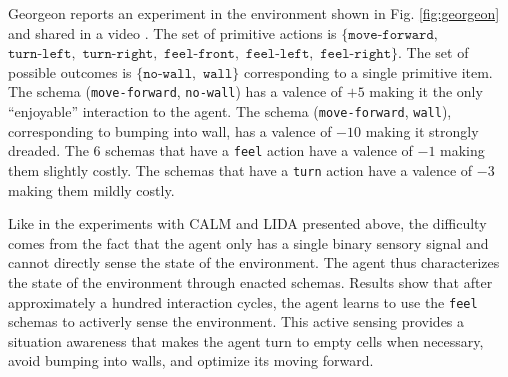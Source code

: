 \documentclass[runningheads]{llncs}
\begin{document}


Georgeon \cite{georgeon_intrinsically-motivated_2012} reports an experiment in the environment shown in Fig. \ref{fig:georgeon} and shared in a video \cite{georgeon_video_2012}.
The set of primitive actions is $\{ \texttt{move-forward},$ $\texttt{turn-left},$ $\texttt{turn-right},$ $\texttt{feel-front},$ $\texttt{feel-left},$ $\texttt{feel-right}\}$.
The set of possible outcomes is $\{ \texttt{no-wall},$ $ \texttt{wall} \}$ corresponding to a single primitive item. 
The schema (\texttt{move-forward}, \texttt{no-wall}) has a valence of $+5$ making it the only ``enjoyable'' interaction to the agent. 
The schema (\texttt{move-forward}, \texttt{wall}), corresponding to bumping into wall, has a valence of $-10$ making it strongly dreaded. 
The 6 schemas that have a \texttt{feel} action have a valence of $-1$ making them slightly costly. 
The schemas that have a \texttt{turn} action  have a valence of $-3$ making them mildly costly. 

Like in the experiments with CALM and LIDA presented above, the difficulty comes from the fact that the agent only has a single binary sensory signal and cannot directly sense the state of the environment. 
The agent thus characterizes the state of the environment through enacted schemas. 
Results show that after approximately a hundred interaction cycles, the agent learns to use the \texttt{feel} schemas to activerly sense the environment. 
This active sensing provides a situation awareness that makes the agent turn to empty cells when necessary, avoid bumping into walls, and optimize its moving forward. 
\end{document}
